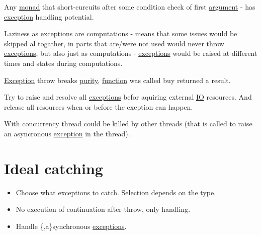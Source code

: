 \documentclass[a4paper,14pt,oneside]{book}
\begin{document}

Any \hyperref[orgd755a1f]{monad} that short-curcuits after some condition check of first \hyperref[orgcdc044c]{argument} - has \hyperref[orga34d850]{exception} handling potential.

Laziness as \hyperref[org92013ae]{exceptions} are computations - means that some issues would be skipped al togather, in parts that are/were not used would never throw \hyperref[org92013ae]{exceptions}, but also just as computations - \hyperref[org92013ae]{exceptions} would be raised at different times and states during computations.

\hyperref[orga34d850]{Exception} throw breaks \hyperref[org0e4ff98]{purity}, \hyperref[org1a6611b]{function} was called buy returned a result.

Try to raise and resolve all \hyperref[org92013ae]{exceptions} befor aquiring external \hyperref[org12ccf19]{IO} resources. And release all resources when or before the exeption can happen.

With concurrency thread could be killed by other threads (that is called to raise an asyncronous \hyperref[orga34d850]{exception} in the thread).

\section{Ideal catching}
\label{sec:org40c0eb0}

\begin{itemize}
\item Choose what \hyperref[org92013ae]{exceptions} to catch. Selection depends on the \hyperref[org99e5c3b]{type}.
\item No execution of continuation after throw, only handling.
\item Handle \{,a\}synchronous \hyperref[org92013ae]{exceptions}.
\end{itemize}
\end{document}
